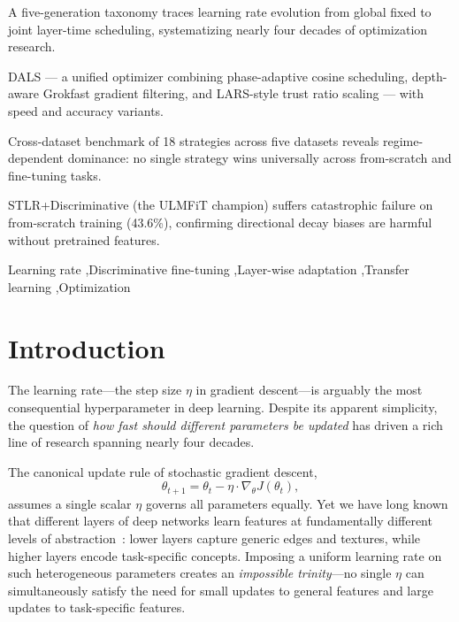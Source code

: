 \documentclass[a4paper,fleqn]{cas-dc}
\begin{document}
\begin{highlights}
\item A five-generation taxonomy traces learning rate evolution from global fixed to joint layer-time scheduling, systematizing nearly four decades of optimization research.
\item DALS --- a unified optimizer combining phase-adaptive cosine scheduling, depth-aware Grokfast gradient filtering, and LARS-style trust ratio scaling --- with speed and accuracy variants.
\item Cross-dataset benchmark of 18 strategies across five datasets reveals regime-dependent dominance: no single strategy wins universally across from-scratch and fine-tuning tasks.
\item STLR+Discriminative (the ULMFiT champion) suffers catastrophic failure on from-scratch training (43.6\%), confirming directional decay biases are harmful without pretrained features.
\end{highlights}

\begin{keywords}
Learning rate \sep Discriminative fine-tuning \sep Layer-wise adaptation \sep Transfer learning \sep Optimization
\end{keywords}

\maketitle

\section{Introduction}\label{sec:intro}

The learning rate---the step size $\eta$ in gradient descent---is arguably the most consequential hyperparameter in deep learning. Despite its apparent simplicity, the question of \emph{how fast should different parameters be updated} has driven a rich line of research spanning nearly four decades.

The canonical update rule of stochastic gradient descent,
\begin{equation}\label{eq:sgd}
\theta_{t+1} = \theta_t - \eta \cdot \nabla_\theta J(\theta_t),
\end{equation}
assumes a single scalar $\eta$ governs all parameters equally. Yet we have long known that different layers of deep networks learn features at fundamentally different levels of abstraction~\citet{yosinski2014transferable}: lower layers capture generic edges and textures, while higher layers encode task-specific concepts. Imposing a uniform learning rate on such heterogeneous parameters creates an \emph{impossible trinity}---no single $\eta$ can simultaneously satisfy the need for small updates to general features and large updates to task-specific features.
\end{document}
